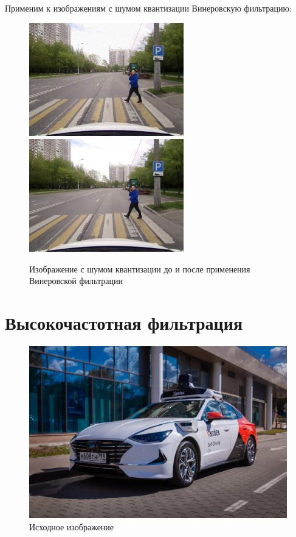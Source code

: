 \pagebreak
Применим к изображениям с шумом квантизации Винеровскую фильтрацию:

\begin{figure}[ht]
    \centering
    \includegraphics[width=0.6\textwidth]{../outputs/image_quant_noise.png}
    \includegraphics[width=0.6\textwidth]{../source/image.png}
    \caption{Изображение с шумом квантизации до и после применения Винеровской фильтрации}
    \label{fig:stich_images}
\end{figure}

\pagebreak

\section{Высокочастотная фильтрация}

\begin{figure}[ht]
    \centering
    \includegraphics[width=\textwidth]{../source/SDC_Yandex.png}
    \caption{Исходное изображение}
    \label{fig:stitch_images}
\end{figure}



